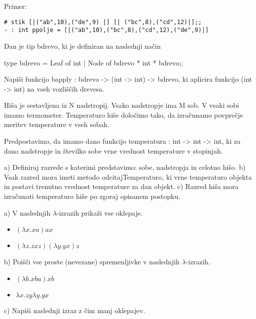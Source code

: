 \begin{ex}
Primer:

\begin{verbatim}
# stik [|("ab",10),("de",9) |] [| ("bc",8),("cd",12)|];;
- : int ppolje = [|("ab",10),("bc",8),("cd",12),("de",9)|]

\end{verbatim}

\end{ex} \begin{ex}
Dan je tip bdrevo, ki je definiran na naslednji na\v cin

type bdrevo = Leaf of int | Node of bdrevo * int * bdrevo;;

Napi\v si funkcijo bapply : bdrevo -> (int -> int) -> bdrevo, ki aplicira funkcijo (int -> int) na vseh vozli\v s\v cih drevesa.  


\end{ex} \begin{ex}
Hi\v sa je sestavljena iz N nadstropij. Vsako nadstropje ima M sob. V vsaki sobi imamo termometer. Temperaturo hi\v se dolo\v cimo tako, da izra\v cunamo povpre\v cje meritev temperature v vseh sobah. 

Predpostavimo, da imamo dano funkcijo temperatura : int -> int -> int, ki za dano nadstropje in \v stevilko sobe vrne vrednost temperature v stopinjah. 

a) Definiraj razrede s katerimi predstavimo: sobe, nadstropja in celotno hi\v so.
b) Vsak razred mora imeti metodo odcitajTemperaturo, ki vrne temperaturo objekta in  postavi trenutno vrednost temperature za dan objekt.
c) Razred hi\v sa mora izra\v cunati temperaturo hi\v se po zgoraj opisanem postopku.


\end{ex} \begin{ex}
a) V naslednjih $\lambda$-izrazih prika\v zi vse oklepaje.  
\begin{itemize}
\item $(\lambda x.xa)ax$ 
\item $(\lambda z.zxz)(\lambda y.yx)z$ 
\end{itemize}
    
b) Poi\v s\v ci vse proste (nevezane) spremenljivke v naslednjih $\lambda$-izrazih. 
\begin{itemize}
\item $(\lambda b.xba)xb$ 
\item $\lambda x.zy\lambda y.yx $
\end{itemize}

c) Napi\v si naslednji izraz z \v cim manj oklepajev. 


\end{ex}
